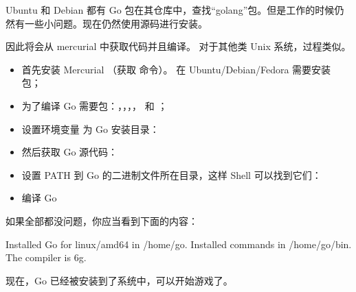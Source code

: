 Ubuntu 和 Debian 都有 Go 包在其仓库中，查找“golang”包。但是工作的时候仍然有一些小问题。现在仍然使用源码进行安装。

因此将会从 mercurial 中获取代码并且编译。
对于其他类 Unix 系统，过程类似。
\begin{itemize}
\item 首先安装 Mercurial （获取  命令）。
在 Ubuntu/Debian/Fedora 需要安装  包；

\item 为了编译 Go 需要包：，，，， 和 ；

\item 设置环境变量  为 Go 安装目录：
\begin{display}
\pr {}
\end{display}

\item 然后获取 Go 源代码：
\begin{display}
\pr {}
\end{display}

\item 设置 PATH 到 Go 的二进制文件所在目录，这样 Shell 可以找到它们：
\begin{display}
\pr {}
\end{display}

\item 编译 Go
\begin{display}
\pr {}
\pr {}
\end{display}
\end{itemize}
如果全部都没问题，你应当看到下面的内容：
\begin{display}
Installed Go for linux/amd64 in /home/go.
Installed commands in /home/go/bin.
The compiler is 6g.
\end{display}
现在，Go 已经被安装到了系统中，可以开始游戏了。


